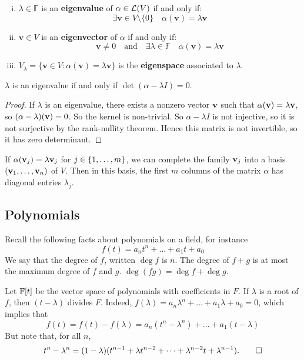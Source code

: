 \documentclass[a4paper]{article}
\begin{document}
\begin{definition}
	\begin{enumerate}[(i)]
		\item $ \lambda\in \mathbb{F} $ is an \textbf{eigenvalue} of $ \alpha\in {\mathcal{L}}(V) $ if and only if: 
		\[
			\exists \mathbf{v}\in V \setminus \{0\}\quad \alpha(\mathbf{v}) = \lambda \mathbf{v}
		\]
		\item $ \mathbf{v}\in V $ is an \textbf{eigenvector} of $\alpha$ if and only if: 
		\[
			\mathbf{v}\neq 0\quad \text{and}\quad \exists \lambda\in \mathbb{F}\quad \alpha(\mathbf{v}) = \lambda \mathbf{v}
		\]
		\item $ V_{\lambda} = \{\mathbf{v}\in V: \alpha(\mathbf{v}) = \lambda \mathbf{v}\} $ is the \textbf{eigenspace} associated to $\lambda$. 
	\end{enumerate}
\end{definition}

\begin{lemma}
	$ \lambda $ is an eigenvalue if and only if $ \det(\alpha - \lambda I) = 0 $.
\end{lemma}
\begin{proof}
	If $ \lambda $ is an eigenvalue, there exists a nonzero vector $ {\bf v} $ such that $ \alpha({\bf v}) = \lambda {\bf v} $, so $ (\alpha - \lambda)({\bf v}) = 0 $.
	So the kernel is non-trivial.
	So $ \alpha - \lambda I $ is not injective, so it is not surjective by the rank-nullity theorem.
	Hence this matrix is not invertible, so it has zero determinant.
\end{proof}

\begin{remark}
	If $ \alpha({\bf v}_j) = \lambda {\bf v}_j $ for $ j \in \qty{1, \dots, m} $, we can complete the family $ {\bf v}_j $ into a basis $ ({\bf v}_1, \dots, {\bf v}_n) $ of $ V $.
	Then in this basis, the first $ m $ columns of the matrix $ \alpha $ has diagonal entries $ \lambda_j $.
\end{remark}
\subsection{Polynomials}
Recall the following facts about polynomials on a field, for instance
\[
	f(t) = a_n t^n + \dots + a_1 t + a_0
\]
We say that the degree of $ f $, written $ \deg f $ is $ n $.
The degree of $ f + g $ is at most the maximum degree of $ f $ and $ g $.
$ \deg (fg) = \deg f + \deg g $.

Let $ {\mathbb{F}}[t] $ be the vector space of polynomials with coefficients in $ F $.
If $ \lambda $ is a root of $ f $, then $ (t-\lambda) $ divides $ F $. Indeed, $ f(\lambda) = a_n \lambda^n + \dots + a_1 \lambda + a_0 = 0 $,
which implies that
\[
	f(t) = f(t) - f(\lambda) = a_n(t^n - \lambda^n) + \dots + a_1(t - \lambda)
\]
But note that, for all $ n $,
\[
	t^n - \lambda^n = (1-\lambda)(t^{n-1} + \lambda t^{n-2} + \dots + \lambda^{n-2} t + \lambda^{n-1}).\qed
\]
\end{document}
